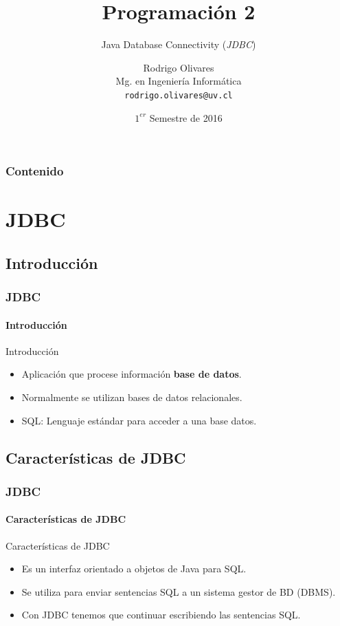 \documentclass{beamer}
\title[\textbf{Programaci\'on 2}]{\textbf{Programaci\'on 2}}
\subtitle{Java Database Connectivity (\emph{JDBC})}
\author[Rodrigo Olivares]
{
	Rodrigo Olivares \\
	\vspace{0.5mm}
	Mg. en Ingenier\'ia Inform\'atica \\
	\vspace{0.5mm}
	\texttt{\normalsize rodrigo.olivares@uv.cl}
}
\institute[Universidad de Valpara\'iso]
\date{$1^{er}$ Semestre de 2016}
\begin{document}
	\begin{frame}
		\titlepage
	\end{frame}

	\begin{frame}
		\frametitle{Contenido}
		\tableofcontents[pausesections]
	\end{frame}

    \section{JDBC}

    \subsection{Introducci\'on}

	\begin{frame}
		\frametitle{JDBC}
		\framesubtitle{Introducci\'on}

		\begin{block}{Introducci\'on}
		    \begin{itemize}
		        \item Aplicaci\'on que procese informaci\'on \textbf{base de datos}.
		        \item Normalmente se utilizan bases de datos relacionales.
		        \item SQL: Lenguaje est\'andar para acceder a una base datos.
		    \end{itemize}
		\end{block}
	\end{frame}
	
    \subsection{Caracter\'isticas de JDBC}	
	
	\begin{frame}
		\frametitle{JDBC}
		\framesubtitle{Caracter\'isticas de JDBC}

		\begin{block}{Caracter\'isticas de JDBC }
		    \begin{itemize}
		        \item Es un interfaz orientado a objetos de Java para SQL.
		        \item Se utiliza para enviar sentencias SQL a un sistema gestor de BD (DBMS).
		        \item Con JDBC tenemos que continuar escribiendo las sentencias SQL.
		    \end{itemize}
		\end{block}
	\end{frame}
\end{document}
